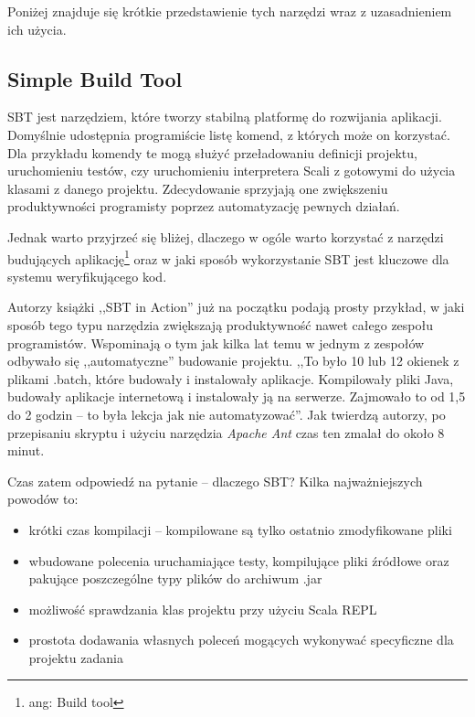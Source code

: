 \documentclass[brudnopis]{xmgr}
\begin{document}
Poniżej znajduje się krótkie przedstawienie tych narzędzi wraz z uzasadnieniem ich użycia. 

\subsection{Simple Build Tool}

SBT jest narzędziem, które tworzy stabilną platformę do rozwijania aplikacji. Domyślnie udostępnia programiście listę komend, z których może on korzystać. Dla przykładu komendy te mogą służyć przeładowaniu definicji projektu, uruchomieniu testów, czy uruchomieniu interpretera Scali z gotowymi do użycia klasami z danego projektu. Zdecydowanie sprzyjają one zwiększeniu produktywności programisty poprzez automatyzację pewnych działań.

Jednak warto przyjrzeć się bliżej, dlaczego w ogóle warto korzystać z narzędzi budujących aplikację\footnote{ang: Build tool} oraz w jaki sposób wykorzystanie SBT jest kluczowe dla systemu weryfikującego kod. 

Autorzy książki ,,SBT in Action'' już na początku podają prosty przykład, w jaki sposób tego typu narzędzia zwiększają produktywność nawet całego zespołu programistów. Wspominają o tym jak kilka lat temu w jednym z zespołów odbywało się ,,automatyczne'' budowanie projektu. ,,To było 10 lub 12 okienek z plikami .batch, które budowały i instalowały aplikacje. Kompilowały pliki Java, budowały aplikacje internetową i instalowały ją na serwerze. Zajmowało to od 1,5 do 2 godzin -- to była lekcja jak nie automatyzować''. \cite[s.1]{Suereth:2014:SIA} Jak twierdzą autorzy, po przepisaniu skryptu i użyciu narzędzia \emph{Apache Ant} czas ten zmalał do około 8 minut.

Czas zatem odpowiedź na pytanie -- dlaczego SBT? Kilka najważniejszych powodów to:
\begin{itemize}
\item krótki czas kompilacji -- kompilowane są tylko ostatnio zmodyfikowane pliki
\item wbudowane polecenia uruchamiające testy, kompilujące pliki źródłowe oraz pakujące poszczególne typy plików do archiwum .jar
\item możliwość sprawdzania klas projektu przy użyciu Scala REPL
\item prostota dodawania własnych poleceń mogących wykonywać specyficzne dla projektu zadania   
\end{itemize}
\end{document}
